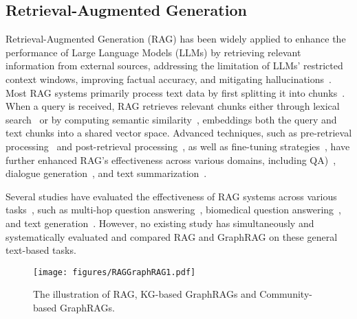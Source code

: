 \subsection{Retrieval-Augmented Generation}
Retrieval-Augmented Generation (RAG) has been widely applied to enhance the performance of Large Language Models (LLMs) by retrieving relevant information from external sources, addressing the limitation of LLMs' restricted context windows, improving factual accuracy, and mitigating hallucinations~\cite{fan2024survey, gao2023retrieval}. Most RAG systems primarily process text data by first splitting it into chunks~\cite{finardi2024chronicles}. When a query is received, RAG retrieves relevant chunks either through lexical search~\cite{ram2023context} or by computing semantic similarity~\cite{karpukhin2020dense}, embeddings both the query and text chunks into a shared vector space. Advanced techniques, such as pre-retrieval processing~\cite{ma2023query, zheng2023take} and post-retrieval processing~\cite{dong2024don, xu2023recomp}, as well as fine-tuning strategies~\cite{li2023structure}, have further enhanced RAG’s effectiveness across various domains, including QA)~\cite{yan2024corrective}, dialogue generation~\cite{izacard2023atlas}, and text summarization~\cite{jiang2023active}.

Several studies have evaluated the effectiveness of RAG systems across various tasks~\cite{yu2024evaluation, chen2024benchmarking, es2023ragas}, such as multi-hop question answering~\cite{tang2024multihop}, biomedical question answering~\cite{xiong2024benchmarking}, and text generation~\cite{liu2023recall}. However, no existing study has simultaneously and systematically evaluated and compared RAG and GraphRAG on these general text-based tasks.

\begin{figure*}[!htb]
    \centering
   \texttt{[image: figures/RAGGraphRAG1.pdf]}
    \caption{The illustration of RAG, KG-based GraphRAGs and Community-based GraphRAGs.}
    \label{fig:framework}
    \vspace{-0.2in}
\end{figure*}

